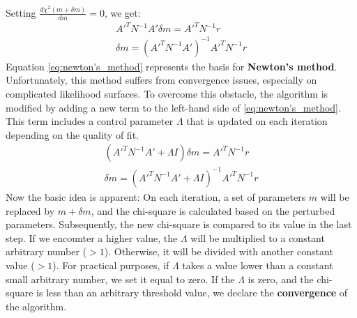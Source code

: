 \documentclass[%
 reprint,
 amsmath,amssymb,
 aps,
]{revtex4-2}
\begin{document}
Setting $\frac{d \chi^2 (m +\delta m)}{dm} = 0$, we get:
\begin{gather}
    A'^{T} N^{-1}A' \delta m = A'^T N^{-1} r \\
    \delta m = \left(A'^{T} N^{-1}A'\right)^{-1} A'^T N^{-1} r \label{eq:newton's_method}   
\end{gather}
Equation \ref{eq:newton's_method} represents the basis for \textbf{Newton's method}. Unfortunately, this method suffers from convergence issues, especially on complicated likelihood surfaces. To overcome this obstacle, the algorithm is modified by adding a new term to the left-hand side of \ref{eq:newton's_method}. This term includes a control parameter $\Lambda$ that is updated on each iteration depending on the quality of fit. 
\begin{gather}
    \left(A'^{T} N^{-1}A' + \Lambda I\right)\delta m = A'^T N^{-1} r\\
    \delta m = \left(A'^{T} N^{-1}A' + \Lambda I\right)^{-1} A'^T N^{-1} r \label{eq:LM}
\end{gather}
Now the basic idea is apparent: On each iteration, a set of parameters $m$ will be replaced by $m+\delta m$, and the chi-square is calculated based on the perturbed parameters. Subsequently, the new chi-square is compared to its value in the last step. If we encounter a higher value, the $\Lambda$ will be multiplied to a constant arbitrary number ($>1$). Otherwise, it will be divided with another constant value ($>1$). For practical purposes, if $\Lambda$ takes a value lower than a constant small arbitrary number, we set it equal to zero. If the $\Lambda$ is zero, and the chi-square is less than an arbitrary threshold value, we declare the \textbf{convergence} of the algorithm.\par


\end{document}
